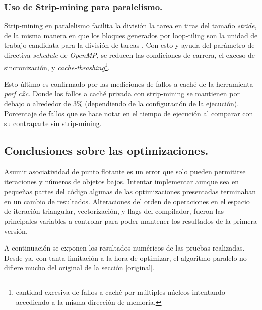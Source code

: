 \documentclass{article}
\begin{document}
\subsubsection{Uso de Strip-mining para paralelismo.\label{strip-mining-parallel}}
Strip-mining en paralelismo facilita la división la tarea en tiras del tamaño \textit{stride}, de la misma
manera en que los bloques generados por loop-tiling son la unidad de trabajo candidata para la división
de tareas \cite{Wolfe89moreiteration}. Con esto y ayuda del parámetro de directiva \textit{schedule} de \textit{OpenMP},
se reducen las condiciones de carrera, el exceso de sincronización, y \textit{cache-thrashing}\footnote{cantidad excesiva
de fallos a caché por múltiples núcleos intentando accediendo a la misma dirección de memoria.}.

Esto último es confirmado por las mediciones de fallos a caché de la herramienta \textit{perf c2c}.
Donde los fallos a caché privada con strip-mining se mantienen por debajo o alrededor de 3\%
(dependiendo de la configuración de la ejecución). Porcentaje de fallos que se hace notar en
el tiempo de ejecución al comparar con su contraparte sin strip-mining.


\subsection{Conclusiones sobre las optimizaciones.\label{opt_conclusiones}}
Asumir asociatividad de punto flotante es un error que solo pueden permitirse iteraciones
y números de objetos bajos. Intentar implementar aunque sea en pequeñas partes del código algunas de
las optimizaciones presentadas terminaban en un cambio de resultados. Alteraciones del orden de operaciones
en el espacio de iteración triangular, vectorización, y flags del compilador, fueron las principales
variables a controlar para poder mantener los resultados de la primera versión.


A continuación se exponen los resultados numéricos de las pruebas realizadas.
Desde ya, con tanta limitación a la hora de optimizar, el algoritmo paralelo no difiere mucho del
original de la sección \ref{original}.
\end{document}
